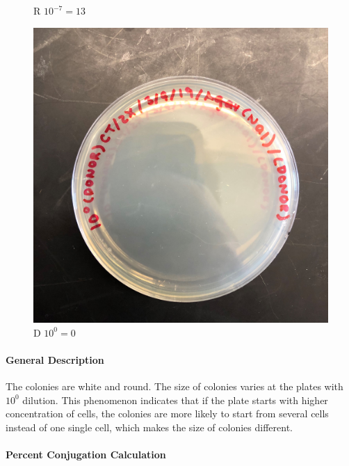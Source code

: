 \documentclass{article}
\begin{document}
\begin{figure}[H]
\begin{minipage}[t]{0.32\textwidth}
					\caption{R $10^{-7} = 13$}
				\end{minipage}
			\end{figure}
			\begin{figure}[H]
				\begin{minipage}[t]{0.5\textwidth}
					\centering
					\includegraphics[width = 0.432\linewidth]{Done_0_Nal.jpg}
					\caption{D $10^0 = 0$}
				\end{minipage}
			\end{figure}
			\paragraph{General Description} The colonies are white and round. The size of colonies varies at the plates with $10 ^ 0$ dilution. This phenomenon indicates that if the plate starts with higher concentration of cells, the colonies are more likely to start from several cells instead of one single cell, which makes the size of colonies different.

			\paragraph{Percent Conjugation Calculation} 
\end{document}
